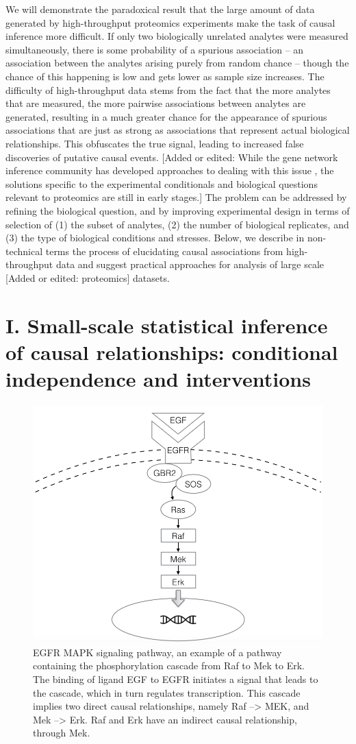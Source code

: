 \documentclass[journal=jacsat,manuscript=article]{achemso}
\def\added#1{{\color{magenta}[Added or edited: #1]}}
\begin{document}
We will demonstrate the paradoxical result that the large amount of data generated by high-throughput proteomics experiments make the task of causal inference more difficult.  If only two biologically unrelated analytes were measured simultaneously, there is some probability of a spurious association -- an association between the analytes arising purely from random chance -- though the chance of this happening is low and gets lower as sample size increases. The difficulty of high-throughput data stems from the fact that the more analytes that are measured, the more pairwise associations between analytes are generated, resulting in a much greater chance for the appearance of spurious associations that are just as strong as associations that represent actual biological relationships.  This obfuscates the true signal, leading to increased false discoveries of putative causal events.  \added{While the gene network inference community has developed approaches to dealing with this issue\cite{bensimon2012mass} , the solutions specific to the experimental conditionals and biological questions relevant to proteomics are still in early stages.} The problem can be addressed by refining the biological question, and by improving experimental design in terms of selection of  (1) the subset of analytes, (2) the number of biological replicates, and (3) the type of biological conditions and stresses. Below, we describe in non-technical terms the process of elucidating causal associations from high-throughput data and suggest practical approaches for analysis of large scale \added{proteomics} datasets. 


\section{I. Small-scale statistical inference of causal relationships: conditional independence and interventions}

\begin{figure}[!tpb]
\centerline{\includegraphics[width=.5\textwidth]{figs/egfr.png}}
\caption{EGFR MAPK signaling pathway, an example of a pathway containing the phosphorylation cascade from Raf to Mek to Erk.  The binding of ligand EGF to EGFR initiates a signal that leads to the cascade, which in turn regulates transcription.  This cascade implies two direct causal relationships, namely Raf --> MEK, and Mek --> Erk.  Raf and Erk have an indirect causal relationship, through Mek.\label{mapk}}
\end{figure}
\end{document}
